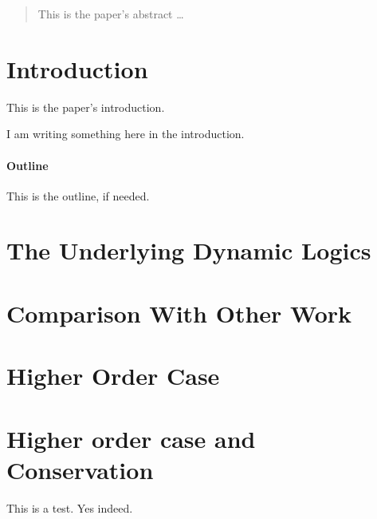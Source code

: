 \documentclass[a4paper,12pt]{article}
\begin{document}
\maketitle

\begin{abstract}
This is the paper's abstract \ldots
\end{abstract}

\section{Introduction}
This is the paper's introduction.

I am writing something here in the introduction.

\paragraph{Outline}
This is the outline, if needed.

\section{The Underlying Dynamic Logics}


\section{Comparison With Other Work}

\section{Higher Order Case}


\section{Higher order case and Conservation}

This is a test. Yes indeed.




\end{document}
